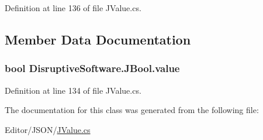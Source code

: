 Definition at line 136 of file J\+Value.\+cs.



\subsection{Member Data Documentation}
\hypertarget{class_disruptive_software_1_1_j_bool_a637879ae8b9c3ef8a509fd59e6ce9d2e}{
\subsubsection[{value}]{\setlength{\rightskip}{0pt plus 5cm}bool Disruptive\+Software.\+J\+Bool.\+value}}\label{class_disruptive_software_1_1_j_bool_a637879ae8b9c3ef8a509fd59e6ce9d2e}


Definition at line 134 of file J\+Value.\+cs.



The documentation for this class was generated from the following file\+:\begin{DoxyCompactItemize}
\item 
Editor/\+J\+S\+O\+N/\hyperlink{_j_value_8cs}{J\+Value.\+cs}\end{DoxyCompactItemize}
